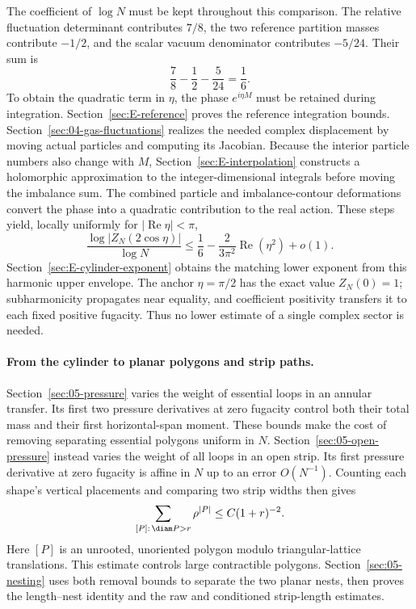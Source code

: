 The coefficient of $\log N$ must be kept throughout this comparison.
The relative fluctuation determinant contributes $7/8$, the two
reference partition masses contribute $-1/2$, and the scalar vacuum
denominator contributes $-5/24$. Their sum is
\[
 \frac78-\frac12-\frac5{24}=\frac16.
\]
To obtain the quadratic term in $\eta$, the phase $e^{i\eta M}$
must be retained during integration.
Section~\ref{sec:E-reference} proves the reference integration
bounds. Section~\ref{sec:04-gas-fluctuations} realizes the needed
complex displacement by moving actual particles and computing its
Jacobian. Because the interior particle numbers also change with $M$,
Section~\ref{sec:E-interpolation} constructs a holomorphic approximation
to the integer-dimensional integrals before moving the imbalance sum.
The combined particle and imbalance-contour deformations convert the
phase into a quadratic contribution to the real action.
These steps yield, locally uniformly for $|\operatorname{Re}\eta|<\pi$,
\[
 \frac{\log|Z_N(2\cos\eta)|}{\log N}
 \le \frac16-\frac{2}{3\pi^2}\operatorname{Re}(\eta^2)+o(1).
\]
Section~\ref{sec:E-cylinder-exponent} obtains the matching lower
exponent from this harmonic upper envelope. The anchor $\eta=\pi/2$
has the exact value $Z_N(0)=1$; subharmonicity propagates near equality,
and coefficient positivity transfers it to each fixed positive
fugacity. Thus no lower estimate of a single complex sector is needed.

\paragraph{From the cylinder to planar polygons and strip paths.}
Section~\ref{sec:05-pressure} varies the weight of essential loops
in an annular transfer. Its first two pressure derivatives at zero fugacity control
both their total mass and their first horizontal-span moment. These
bounds make the cost of removing separating essential polygons uniform
in $N$.
Section~\ref{sec:05-open-pressure} instead varies the weight of all
loops in an open strip. Its first pressure derivative at zero fugacity
is affine in $N$ up to an error $O(N^{-1})$. Counting each shape's
vertical placements and comparing two strip widths then gives
\[
 \sum_{[P]:\,\diam P>r}\rho^{|P|}\le C(1+r)^{-2}.
\]
Here $[P]$ is an unrooted, unoriented polygon modulo triangular-lattice
translations. This estimate controls large contractible polygons.
Section~\ref{sec:05-nesting} uses both removal bounds to separate
the two planar nests, then proves the length--nest identity and the
raw and conditioned strip-length estimates.

